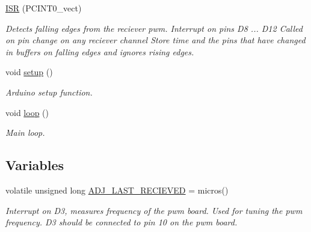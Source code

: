 \begin{DoxyCompactItemize}
\item 
\hyperlink{group__Functions_gaa64c6dce15e9de9105b4ae9533c9a267}{I\+SR} (P\+C\+I\+N\+T0\+\_\+vect)\hypertarget{group__Functions_gaa64c6dce15e9de9105b4ae9533c9a267}{}\label{group__Functions_gaa64c6dce15e9de9105b4ae9533c9a267}

\begin{DoxyCompactList}\small\item\em Detects falling edges from the reciever pwm. Interrupt on pins D8 ... D12 Called on pin change on any reciever channel Store time and the pins that have changed in buffers on falling edges and ignores rising edges. \end{DoxyCompactList}\item 
void \hyperlink{group__Functions_ga4fc01d736fe50cf5b977f755b675f11d}{setup} ()\hypertarget{group__Functions_ga4fc01d736fe50cf5b977f755b675f11d}{}\label{group__Functions_ga4fc01d736fe50cf5b977f755b675f11d}

\begin{DoxyCompactList}\small\item\em Arduino setup function. \end{DoxyCompactList}\item 
void \hyperlink{group__Functions_gafe461d27b9c48d5921c00d521181f12f}{loop} ()\hypertarget{group__Functions_gafe461d27b9c48d5921c00d521181f12f}{}\label{group__Functions_gafe461d27b9c48d5921c00d521181f12f}

\begin{DoxyCompactList}\small\item\em Main loop. \end{DoxyCompactList}\end{DoxyCompactItemize}
\subsection*{Variables}
\begin{DoxyCompactItemize}
\item 
volatile unsigned long \hyperlink{group__Functions_ga7628f22c0dc6ed71f69c76f81b959382}{A\+D\+J\+\_\+\+L\+A\+S\+T\+\_\+\+R\+E\+C\+I\+E\+V\+ED} = micros()\hypertarget{group__Functions_ga7628f22c0dc6ed71f69c76f81b959382}{}\label{group__Functions_ga7628f22c0dc6ed71f69c76f81b959382}

\begin{DoxyCompactList}\small\item\em Interrupt on D3, measures frequency of the pwm board. Used for tuning the pwm frequency. D3 should be connected to pin 10 on the pwm board. \end{DoxyCompactList}\end{DoxyCompactItemize}



